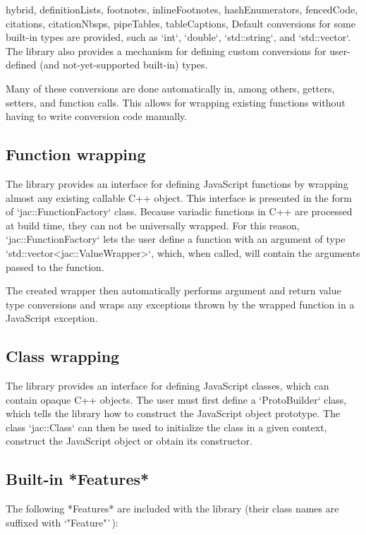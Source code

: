 \documentclass[
  digital,
  oneside,
  nosansbold,
  nocolorbold,
  lof,
  lot
]{fithesis4}
\begin{document}
\begin{markdown*}{%
  hybrid,
  definitionLists,
  footnotes,
  inlineFootnotes,
  hashEnumerators,
  fencedCode,
  citations,
  citationNbsps,
  pipeTables,
  tableCaptions,
}
Default conversions for some built-in types are provided, such as `int`, `double`, `std::string`, and `std::vector`. The library also provides a mechanism for defining custom conversions for user-defined (and not-yet-supported built-in) types.

Many of these conversions are done automatically in, among others, getters, setters, and function calls. This allows for wrapping existing functions without having to write conversion code manually.

\subsection{Function wrapping}

The library provides an interface for defining JavaScript functions by wrapping almost any existing callable C++ object. This interface is presented in the form of `jac::FunctionFactory` class. Because variadic functions in C++ are processed at build time, they can not be universally wrapped. For this reason, `jac::FunctionFactory` lets the user define a function with an argument of type `std::vector<jac::ValueWrapper>`, which, when called, will contain the arguments passed to the function.

The created wrapper then automatically performs argument and return value type conversions and wraps any exceptions thrown by the wrapped function in a JavaScript exception.

\subsection{Class wrapping}

The library provides an interface for defining JavaScript classes, which can contain opaque C++ objects. The user must first define a `ProtoBuilder` class, which tells the library how to construct the JavaScript object prototype. The class `jac::Class` can then be used to initialize the class in a given context, construct the JavaScript object or obtain its constructor.

\subsection{Built-in *Features*}

The following *Features* are included with the library (their class names are suffixed with `"Feature"`):


\end{markdown*}
\end{document}
